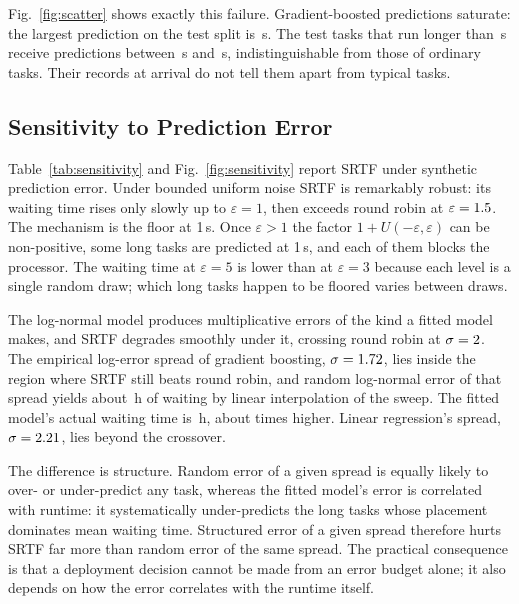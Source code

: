 \documentclass[conference]{IEEEtran}
\begin{document}
Fig.~\ref{fig:scatter} shows exactly this failure. Gradient-boosted
predictions saturate: the largest prediction on the test split is
\maxGBMPred{}\,s. The \nLongTest{} test tasks that run longer than
\longTaskThreshold{}\,s receive predictions between \longGBMMin{}\,s and
\longGBMMax{}\,s, indistinguishable from those of ordinary tasks. Their
records at arrival do not tell them apart from typical tasks.

\subsection{Sensitivity to Prediction Error}
Table~\ref{tab:sensitivity} and Fig.~\ref{fig:sensitivity} report SRTF under
synthetic prediction error. Under bounded uniform noise SRTF is remarkably
robust: its waiting time rises only slowly up to $\varepsilon = 1$, then
exceeds round robin at $\varepsilon = 1.5$. The mechanism is
the floor at 1\,s. Once $\varepsilon > 1$ the factor $1 + U(-\varepsilon,
\varepsilon)$ can be non-positive, some long tasks are predicted at 1\,s,
and each of them blocks the processor. The waiting time at
$\varepsilon = 5$ is lower than at $\varepsilon = 3$ because each level is a
single random draw; which long tasks happen to be floored varies between
draws.

The log-normal model produces multiplicative errors of the kind a fitted
model makes, and SRTF degrades smoothly under it, crossing round robin at
$\sigma = 2$. The empirical log-error spread of gradient
boosting, $\sigma = 1.72$, lies inside the region where SRTF still beats
round robin, and random log-normal error of that spread yields about
\wNoiseAtSigmaGBM{}\,h of waiting by linear interpolation of the sweep. The
fitted model's actual waiting time is \wGBM{}\,h, about \ratioGBMNoise{}
times higher. Linear regression's spread, $\sigma = 2.21$, lies
beyond the crossover.

The difference is structure. Random error of a given spread is equally
likely to over- or under-predict any task, whereas the fitted model's error
is correlated with runtime: it systematically under-predicts the long tasks
whose placement dominates mean waiting time. Structured error of a given
spread therefore hurts SRTF far more than random error of the same spread.
The practical consequence is that a deployment decision cannot be made from
an error budget alone; it also depends on how the error correlates with the
runtime itself.
\end{document}
